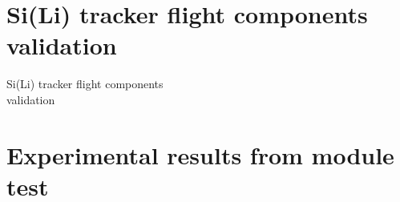 \documentclass[aspectratio=169,xcolor=dvipsnames]{beamer}
\begin{document}

\section{Si(Li) tracker flight components validation\vspace{0.16cm}}

\begin{frame}{Si(Li) tracker flight components \\ \vskip-0.15cm validation}
    \fontsize{9pt}{1}\selectfont
    
\end{frame}



\section{Experimental results from module test\vspace{0.16cm}}
\end{document}

